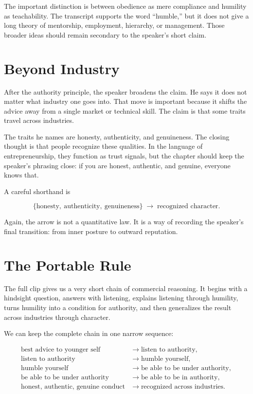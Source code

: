 \begin{remark}
The important distinction is between obedience as mere compliance and humility as teachability. The transcript supports the word ``humble,'' but it does not give a long theory of mentorship, employment, hierarchy, or management. Those broader ideas should remain secondary to the speaker's short claim.
\end{remark}

\section{Beyond Industry}

After the authority principle, the speaker broadens the claim. He says it does not matter what industry one goes into. That move is important because it shifts the advice away from a single market or technical skill. The claim is that some traits travel across industries.

The traits he names are honesty, authenticity, and genuineness. The closing thought is that people recognize these qualities. In the language of entrepreneurship, they function as trust signals, but the chapter should keep the speaker's phrasing close: if you are honest, authentic, and genuine, everyone knows that.

A careful shorthand is

\begin{equation}
\{\text{honesty},\ \text{authenticity},\ \text{genuineness}\}
\;\longrightarrow\;
\text{recognized character}.
\end{equation}

Again, the arrow is not a quantitative law. It is a way of recording the speaker's final transition: from inner posture to outward reputation.

\section{The Portable Rule}

The full clip gives us a very short chain of commercial reasoning. It begins with a hindsight question, answers with listening, explains listening through humility, turns humility into a condition for authority, and then generalizes the result across industries through character.

We can keep the complete chain in one narrow sequence:

\begin{align}
\text{best advice to younger self}
&\longrightarrow
\text{listen to authority},\\
\text{listen to authority}
&\longrightarrow
\text{humble yourself},\\
\text{humble yourself}
&\longrightarrow
\text{be able to be under authority},\\
\text{be able to be under authority}
&\longrightarrow
\text{be able to be in authority},\\
\text{honest, authentic, genuine conduct}
&\longrightarrow
\text{recognized across industries}.
\end{align}

